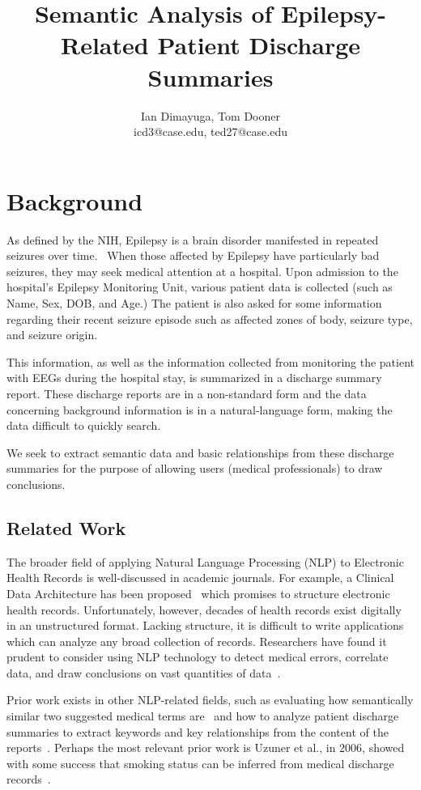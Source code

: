 \documentclass[12pt]{article}
\title{Semantic Analysis of Epilepsy-Related Patient Discharge Summaries}
\author{Ian Dimayuga, Tom Dooner \\icd3@case.edu, ted27@case.edu}
\begin{document}
\maketitle

\section{Background}
As defined by the NIH, Epilepsy is a brain disorder manifested in repeated seizures
over time.~\cite{nih-epilepsy} When those affected by Epilepsy have particularly bad 
seizures, they
may seek medical attention at a hospital. Upon admission to the hospital's Epilepsy
Monitoring Unit, various patient data is collected (such as Name, Sex, DOB,
and Age.) The patient is also asked for some information regarding their recent seizure
episode such as affected zones of body, seizure type, and seizure origin.

This information, as well as the information collected from monitoring the patient
with EEGs during the hospital stay, is summarized in a discharge summary report.
These discharge reports are in a non-standard form and the data concerning background
information is in a natural-language form, making the data difficult to quickly
search.

We seek to extract semantic data and basic relationships from these discharge summaries
for the purpose of allowing users (medical professionals) to draw conclusions.

\subsection{Related Work}
The broader field of applying Natural Language Processing (NLP) to Electronic Health Records
is well-discussed in academic journals. For example, a Clinical Data Architecture has been
proposed~\cite{CDA} which promises to structure electronic health records. Unfortunately, however,
decades of health records exist digitally in an unstructured format. Lacking structure, it is
difficult to write applications which can analyze any broad collection of records. Researchers
have found it prudent to consider using NLP technology to detect medical errors, correlate data, 
and draw conclusions on vast quantities of data~\cite{friedman}.

Prior work exists in other NLP-related fields, such as evaluating how semantically similar 
two suggested medical terms are~\cite{Pedersen2007288} and how to analyze patient
discharge summaries to extract keywords and key relationships from the content of the
reports~\cite{soderland}. Perhaps the most relevant prior work is Uzuner et al., in 2006,
showed with some success that smoking status can be inferred from medical discharge 
records~\cite{Uzuner200814}.
\end{document}
